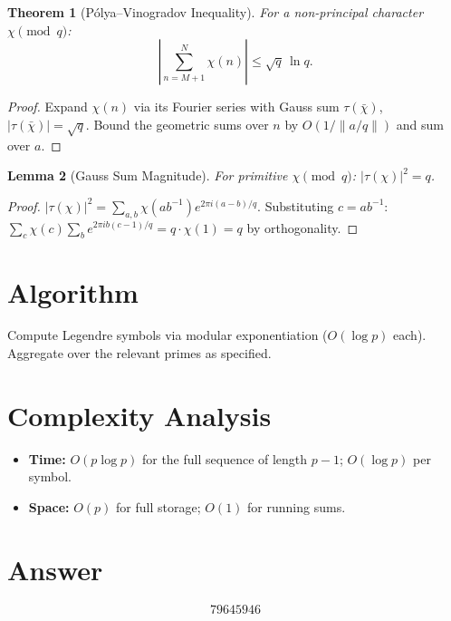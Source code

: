 \documentclass[11pt]{article}
\newtheorem{theorem}{Theorem}
\newtheorem{lemma}[theorem]{Lemma}
\begin{document}
\begin{theorem}[P\'olya--Vinogradov Inequality]
For a non-principal character $\chi \pmod{q}$:
\[
\left|\sum_{n=M+1}^{N}\chi(n)\right| \le \sqrt{q}\,\ln q.
\]
\end{theorem}

\begin{proof}
Expand $\chi(n)$ via its Fourier series with Gauss sum $\tau(\bar\chi)$, $|\tau(\bar\chi)|=\sqrt{q}$. Bound the geometric sums over $n$ by $O(1/\|a/q\|)$ and sum over $a$.
\end{proof}

\begin{lemma}[Gauss Sum Magnitude]
For primitive $\chi \pmod{q}$: $|\tau(\chi)|^2 = q$.
\end{lemma}

\begin{proof}
$|\tau(\chi)|^2 = \sum_{a,b}\chi(ab^{-1})e^{2\pi i(a-b)/q}$. Substituting $c = ab^{-1}$: $\sum_c \chi(c)\sum_b e^{2\pi ib(c-1)/q} = q\cdot\chi(1) = q$ by orthogonality.
\end{proof}

\section{Algorithm}

Compute Legendre symbols via modular exponentiation ($O(\log p)$ each). Aggregate over the relevant primes as specified.

\section{Complexity Analysis}

\begin{itemize}
\item \textbf{Time:} $O(p\log p)$ for the full sequence of length $p-1$; $O(\log p)$ per symbol.
\item \textbf{Space:} $O(p)$ for full storage; $O(1)$ for running sums.
\end{itemize}

\section{Answer}

\[
\boxed{79645946}
\]
\end{document}

